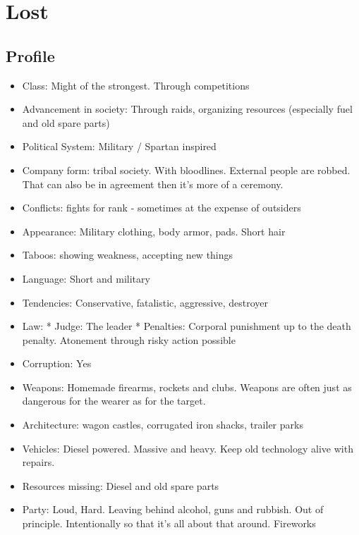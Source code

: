 \section{Lost}


\subsection{Profile}
\begin{itemize}
    \item Class: Might of the strongest. Through competitions
    \item Advancement in society: Through raids, organizing resources (especially fuel and old spare parts)
    \item Political System: Military / Spartan inspired
    \item Company form: tribal society. With bloodlines. External people are robbed. That can also be in agreement then it's more of a ceremony.
    \item Conflicts: fights for rank - sometimes at the expense of outsiders
    \item Appearance: Military clothing, body armor, pads. Short hair
    \item Taboos: showing weakness, accepting new things
    \item Language: Short and military
    \item Tendencies: Conservative, fatalistic, aggressive, destroyer
    \item Law: * Judge: The leader * Penalties: Corporal punishment up to the death penalty. Atonement through risky action possible
    \item Corruption: Yes
    \item Weapons: Homemade firearms, rockets and clubs. Weapons are often just as dangerous for the wearer as for the target.
    \item Architecture: wagon castles, corrugated iron shacks, trailer parks
    \item Vehicles: Diesel powered. Massive and heavy. Keep old technology alive with repairs.
    \item Resources missing: Diesel and old spare parts
    \item Party: Loud, Hard. Leaving behind alcohol, guns and rubbish. Out of principle. Intentionally so that it's all about that around. Fireworks

\end{itemize}
